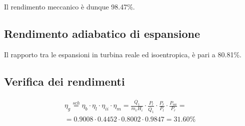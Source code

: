 Il rendimento meccanico è dunque 98.47\%.

\subsection{Rendimento adiabatico di espansione}
Il rapporto tra le espansioni in turbina reale ed isoentropica, è pari a 80.81\%.

\subsection{Verifica dei rendimenti}
\begin{align*}
    \eta_g \stackrel{sch}{=} \eta_b \cdot \eta_l \cdot \eta_{ii} \cdot \eta_m
    = \frac{\dot{Q_1}}{\dot{m}_c H_i}\cdot \frac{P_l}{\dot{Q_1}} \cdot \frac{P_r}{P_l}\cdot \frac{P_{ua}}{P_r} = \\
    =  0.9008 \cdot 0.4452 \cdot 0.8002 \cdot 0.9847 = 31.60 \%
\end{align*}
